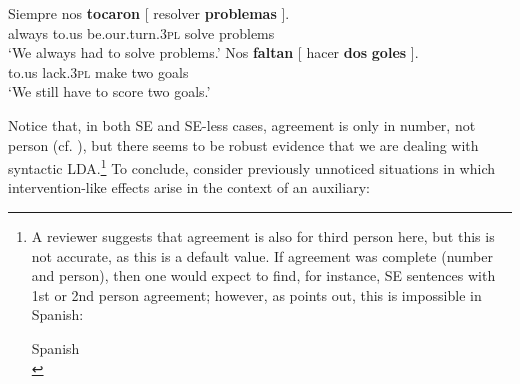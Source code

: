 \documentclass[output=paper]{langsci/langscibook}
\begin{document}
\ea%
    \label{ex:gallego:11}
    \ea
    \gll Siempre   nos    \textbf{tocaron}              [ resolver  \textbf{problemas} ].\\
         always    to.us  be.our.turn.\textsc{3pl} {} solve       problems\\
    \glt ‘We always had to solve problems.’
    \ex
    \gll Nos   \textbf{faltan}    [ hacer  \textbf{dos}  \textbf{goles} ].\\
         to.us  lack.\textsc{3pl} {} make two goals\\
    \glt ‘We still have to score two goals.’
    \z
\z    

Notice that, in both SE and SE-less cases, agreement is only in number, not person (cf. \citealt{Etxepare2006}), but there seems to be robust evidence that we are dealing with syntactic LDA.\footnote{%
    A reviewer suggests that agreement is also for third person here, but this is not accurate, as this is a default value. If agreement was complete (number and person), then one would expect to find, for instance, SE sentences with 1st or 2nd person agreement; however, as \citet{López2007} points out, this is impossible in Spanish:
    
    \ea Spanish \citep[127]{López2007}\\
    \z
    \z} 
To conclude, consider previously unnoticed situations in which intervention-like effects arise in the context of an auxiliary: 

\ea%
    \label{ex:gallego:12}
    \z
\z
\end{document}

